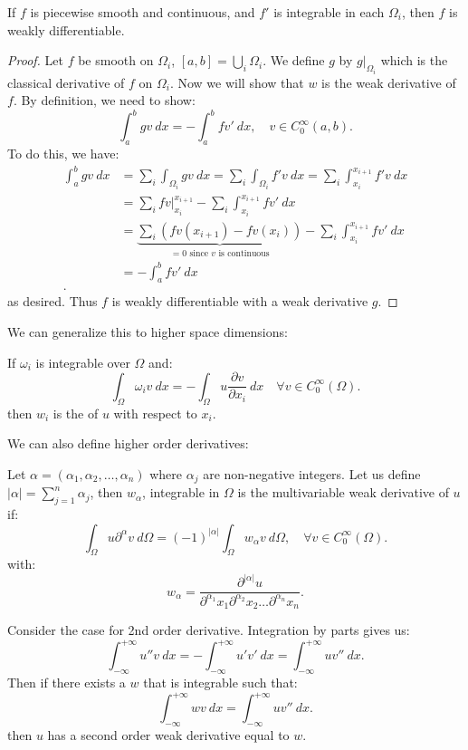 \documentclass[../main/main.tex]{subfiles}
\begin{document}
\begin{theorem}
    If $f$ is piecewise smooth and continuous, and $f'$ is integrable in each $\Omega_i$, then $f$ is weakly differentiable.  
\end{theorem}
\begin{proof}
Let $f$ be smooth on $\Omega_i$,  $[a,b]= \bigcup\limits_{i}\Omega_i $. We define $g$ by $g\big\rvert_{\Omega_i}$ which is the classical derivative of $f$ on $\Omega_i$. Now we will show that $w$ is the weak derivative of $f$. By definition, we need to show: \[
    \int^b_a gv ~dx = -\int^b_a f v'~dx, \quad v \in  C^{\infty}_0(a,b)
.\] To do this, we have: 
\begin{align*}
    \int^b_a gv~dx &= \sum_i \int_{\Omega_i} gv~dx = \sum_i \int_{\Omega_i} f'v~dx = \sum_i\int ^{x_{i+1}}_{x_i} f'v ~dx \\
                   &= \sum_i fv\bigg\rvert ^{x_{i+1}}_{x_i} - \sum_i \int ^{x_{i+1}}_{x_{i}}f v'~dx \\
                   &= \underbrace{\sum_i \left( fv(x_{i+1}) - fv(x_{i})  \right)}_{ = 0 \text{  since $v$ is continuous}} - \sum_i \int ^{x_{i+1}}_{x_{i}}f v'~dx \\ 
                   &= -\int^b_a fv'~dx \\
.\end{align*}as desired.
Thus $f$ is weakly differentiable with a weak derivative $g$. 
\end{proof}
We can generalize this to higher space dimensions:
\begin{definition}
   If $\omega_i$ is integrable over  $\Omega$ and:  \[
       \int_{\Omega} \omega_i v ~dx = - \int_{\Omega} u \frac{\partial v}{\partial x_i} ~dx \quad \forall  v \in  C^{\infty}_0 (\Omega)
   .\]  then $w_i$ is the  of $u$ with respect to $x_i$.
\end{definition}
We can also define higher order derivatives: 
\begin{definition}
    Let $\alpha = (\alpha_1,\alpha_2,\ldots,\alpha_n)$ where $\alpha_j$ are non-negative integers. Let us define $|\alpha| = \sum_{j=1}^{n} \alpha_j$, then $w_\alpha$, integrable in  $\Omega$ is the multivariable weak derivative of  $u$ if:  \[
        \int_{\Omega} u \partial^{\alpha} v~d\Omega = (-1)^{|\alpha|} \int_{\Omega} w_\alpha v~d\Omega, \quad \forall  v \in  C^{\infty}_0 (\Omega)
    .\] with: \[
    w_\alpha = \frac{\partial ^{|\alpha|}u}{\partial^{\alpha_1} x_1\partial^{\alpha_2} x_2\ldots\partial^{\alpha_n} x_n} 
    .\] 
\end{definition}
\begin{remark}
   Consider the case for 2nd order derivative. Integration by parts gives us: \[
   \int ^{+\infty}_{-\infty} u'' v ~dx = - \int ^{+\infty}_{-\infty} u'v' ~dx = \int ^{+\infty}_{-\infty} uv''~dx
   .\] Then if there exists a $w$ that is integrable such that: \[
   \int ^{+\infty}_{-\infty} wv~dx = \int ^{+\infty}_{-\infty} uv''~dx
   .\] then $u $ has a second order weak derivative equal to $w$.
\end{remark}
\end{document}
